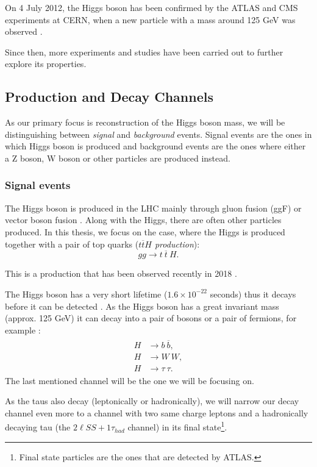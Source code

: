 \documentclass{ctuthesis}
\begin{document}
On 4 July 2012, the Higgs boson has been confirmed by the ATLAS and CMS experiments at CERN, when a new particle with a mass around 125 GeV was observed \cite{higgs}.

Since then, more experiments and studies have been carried out to further explore its properties.

\subsection{Production and Decay Channels}
\label{signal_background}
As our primary focus is reconstruction of the Higgs boson mass, we will be distinguishing between \emph{signal} and \emph{background} events. Signal events are the ones in which Higgs boson is produced and background events are the ones where either a Z boson, W boson or other particles are produced instead.

\subsubsection{Signal events}
The Higgs boson is produced in the LHC mainly through gluon fusion (ggF) or vector boson fusion \cite{higgs_2}. Along with the Higgs, there are often other particles produced. In this thesis, we focus on the case, where the Higgs is produced together with a pair of top quarks (\emph{$t\overline{t}H$ production}):
$$gg \rightarrow t\: \overline{t} \: H.$$

This is a production that has been observed recently in 2018 \cite{ttH_observation}.

The Higgs boson has a very short lifetime ($1.6\times 10^{-22}$ seconds) thus it decays before it can be detected \cite{higgs_3}. As the Higgs boson has a great invariant mass (approx. 125 GeV) it can decay into a pair of bosons or a pair of fermions, for example \cite{higgs_2}:
\begin{align}
\begin{split}
 H &\rightarrow b\: \overline{b}, \\
 H &\rightarrow W\: W, \\
 H &\rightarrow \tau\: \tau.
\end{split}
\end{align}
The last mentioned channel will be the one we will be focusing on.

As the taus also decay (leptonically or hadronically), we will narrow our decay channel even more to a channel with two same charge leptons and a hadronically decaying tau (the $2\ell SS + 1 \tau_{had}$ channel) in its final state\footnote{Final state particles are the ones that are detected by ATLAS.}.
\end{document}
